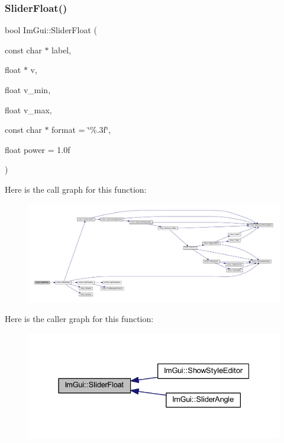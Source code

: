 \mbox{\label{namespace_im_gui_a35dcc90b1981663bcc6e3e8eb5c75021}} 
\subsubsection{\texorpdfstring{Slider\+Float()}{SliderFloat()}}
{\footnotesize\ttfamily bool Im\+Gui\+::\+Slider\+Float (\begin{DoxyParamCaption}\item[{const char $\ast$}]{label,  }\item[{float $\ast$}]{v,  }\item[{float}]{v\+\_\+min,  }\item[{float}]{v\+\_\+max,  }\item[{const char $\ast$}]{format = {\ttfamily \char`\"{}\%.3f\char`\"{}},  }\item[{float}]{power = {\ttfamily 1.0f} }\end{DoxyParamCaption})}

Here is the call graph for this function\+:
\nopagebreak
\begin{figure}[H]
\begin{center}
\leavevmode
\includegraphics[width=350pt]{namespace_im_gui_a35dcc90b1981663bcc6e3e8eb5c75021_cgraph}
\end{center}
\end{figure}
Here is the caller graph for this function\+:
\nopagebreak
\begin{figure}[H]
\begin{center}
\leavevmode
\includegraphics[width=331pt]{namespace_im_gui_a35dcc90b1981663bcc6e3e8eb5c75021_icgraph}
\end{center}
\end{figure}
\mbox{\label{namespace_im_gui_a663988b63d70d864e3acfe51f5be602c}} 

